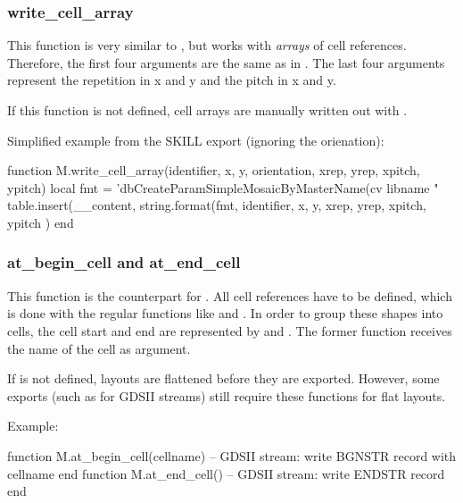 \subsubsection{write\_cell\_array}
This function is very similar to , but works with \emph{arrays} of cell references.
Therefore, the first four arguments are the same as in .
The last four arguments represent the repetition in x and y and the pitch in x and y.

If this function is not defined, cell arrays are manually written out with .

Simplified example from the SKILL export (ignoring the orienation):
\begin{lualisting}
    function M.write_cell_array(identifier, x, y, orientation, xrep, yrep, xpitch, ypitch)
        local fmt = 'dbCreateParamSimpleMosaicByMasterName(cv libname "%
        table.insert(__content, string.format(fmt,
            identifier,
            x, y,
            xrep, yrep, xpitch, ypitch
        )
    end
\end{lualisting}

\subsubsection{at\_begin\_cell and at\_end\_cell}
This function is the counterpart for .
All cell references have to be defined, which is done with the regular functions like  and .
In order to group these shapes into cells, the cell start and end are represented by  and .
The former function receives the name of the cell as argument.

If  is not defined, layouts are flattened before they are exported.
However, some exports (such as for GDSII streams) still require these functions for flat layouts.

Example:
\begin{lualisting}
    function M.at_begin_cell(cellname)
        -- GDSII stream: write BGNSTR record with cellname
    end
    function M.at_end_cell()
        -- GDSII stream: write ENDSTR record
    end
\end{lualisting}




